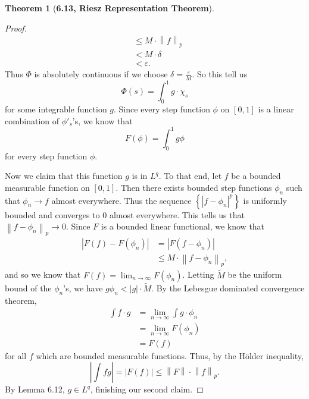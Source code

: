 \documentclass[12pt]{article}
\newcommand{\norm}[1]{\left\lVert #1 \right\rVert}
\newcommand{\abs}[1]{\left\lvert #1 \right\rvert}
\renewcommand{\epsilon}{\varepsilon}
\theoremstyle{definition}
\newtheorem*{thm}{Theorem}
\begin{document}
\begin{thm}[\textbf{6.13, Riesz Representation Theorem}]
\begin{proof}
\begin{align*}
                    &\leq M \cdot \norm{f}_{p} \\
                    &< M \cdot \delta \\
                    &< \epsilon.
                \end{align*}
            Thus \( \Phi \) is absolutely continuous if we choose \( \displaystyle \delta = \frac{\epsilon}{M} \). So this tell us
                \[
                    \Phi(s) = \int_{0}^{1} g \cdot \chi_{s}  
                \]
            for some integrable function \( g \). Since every step function \( \phi \) on \( [0,1] \) is a linear combination of \( \phi'_{s} \)'s, we know that 
                \[
                    F(\phi) = \int_{0}^{1} g \phi    
                \]
            for every step function \( \phi \).
            
            Now we claim that this function \( g \) is in \( L^q \). 
            To that end, let \( f \) be a bounded measurable function on \( [0,1] \).
            Then there exists bounded step functions \( \phi_n \) such that \( \phi_n \to f \) almost everywhere. 
            Thus the sequence \( \displaystyle \left\{ \abs{f - \phi_n}^p \right\} \) is uniformly bounded and converges to \( 0 \) almost everywhere.
            This tells us that \( \norm{f - \phi_n}_{p} \to 0 \).
            Since \( F \) is a bounded linear functional, we know that
                \begin{align*}
                    \abs{F(f) - F(\phi_n)} &= \abs{F(f - \phi_n)} \\
                    &\leq M \cdot \norm{f - \phi_n}_{p},
                \end{align*}
            and so we know that \( \displaystyle F(f) = \lim_{n \to \infty} F(\phi_n) \). Letting \( \tilde{M} \) be the uniform bound of the \( \phi_n \)'s, we have \( g \phi_n < \abs{g} \cdot \tilde{M} \).
            By the Lebesgue dominated convergence theorem,
                \begin{align*}
                    \int f \cdot g &= \lim_{n \to \infty} \int g \cdot \phi_n \\
                    &= \lim_{n \to \infty} F(\phi_n) \\
                    &= F(f)
                \end{align*}
            for all \( f \) which are bounded measurable functions. Thus, by the H\"{o}lder inequality,
                \[
                    \abs{\int fg} =  \abs{F(f)} \leq \norm{F} \cdot \norm{f}_p.
                \]
            By Lemma 6.12, \( g \in L^q \), finishing our second claim. 


\end{proof}
\end{thm}
\end{document}

